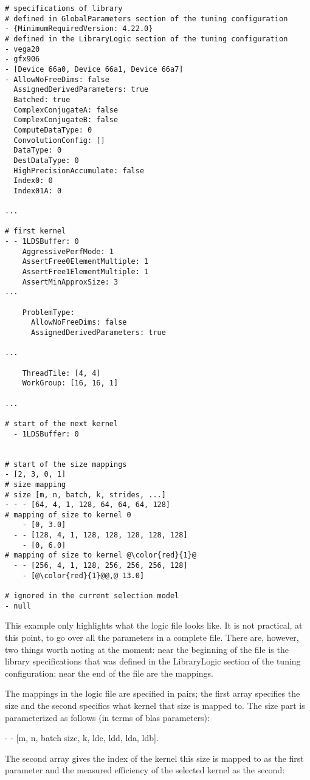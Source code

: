 \documentclass[]{article}
\begin{document}
\begin{verbatim}
# specifications of library
# defined in GlobalParameters section of the tuning configuration
- {MinimumRequiredVersion: 4.22.0}
# defined in the LibraryLogic section of the tuning configuration
- vega20
- gfx906
- [Device 66a0, Device 66a1, Device 66a7]
- AllowNoFreeDims: false
  AssignedDerivedParameters: true
  Batched: true
  ComplexConjugateA: false
  ComplexConjugateB: false
  ComputeDataType: 0
  ConvolutionConfig: []
  DataType: 0
  DestDataType: 0
  HighPrecisionAccumulate: false
  Index0: 0
  Index01A: 0

...

# first kernel
- - 1LDSBuffer: 0
    AggressivePerfMode: 1
    AssertFree0ElementMultiple: 1
    AssertFree1ElementMultiple: 1
    AssertMinApproxSize: 3
...

    ProblemType:
      AllowNoFreeDims: false
      AssignedDerivedParameters: true
      
...

    ThreadTile: [4, 4]
    WorkGroup: [16, 16, 1]

...

# start of the next kernel
  - 1LDSBuffer: 0


# start of the size mappings
- [2, 3, 0, 1]
# size mapping
# size [m, n, batch, k, strides, ...]
- - - [64, 4, 1, 128, 64, 64, 64, 128]
# mapping of size to kernel 0
    - [0, 3.0]
  - - [128, 4, 1, 128, 128, 128, 128, 128]
    - [0, 6.0]
# mapping of size to kernel @\color{red}{1}@
  - - [256, 4, 1, 128, 256, 256, 256, 128]
    - [@\color{red}{1}@@,@ 13.0]

# ignored in the current selection model
- null

\end{verbatim}
\noindent
This example only highlights what the logic file looks like. It is not practical, at this point, to go over all the parameters in a complete file. There are, however, two things worth noting at the moment: near the beginning of the file is the library specifications that was defined in the LibraryLogic section of the tuning configuration; near the end of the file are the mappings.
 
The mappings in the logic file are specified in pairs; the first array specifies the size and the second specifics what kernel that size is mapped to. The size part is parameterized as follows (in terms of blas parameters):
 
\begin{center}
 	- - [m, n, batch size, k, ldc, ldd, lda, ldb]. 
\end{center} 
\noindent
The second array gives the index of the kernel this size is mapped to as the first parameter and the measured efficiency of the selected kernel as the second:
\end{document}
